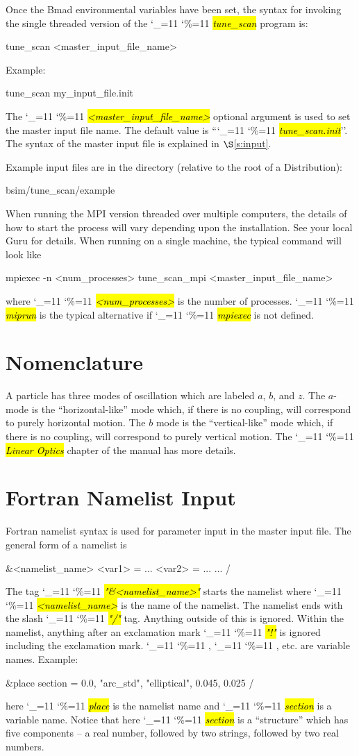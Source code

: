 \documentclass{hitec}
\newcommand\dottcmd[1]{\hl{\em#1}\endgroup}
\newcommand{\vn}{\begingroup\catcode`\_=11 \catcode`\%=11 \dottcmd}
\newcommand{\ts}{\vn{tune_scan}\xspace}
\newcommand{\sref}[1]{$\S$\ref{#1}}
\newcommand{\Section}[1]{\section{#1}\vspace*{-1ex}}
\begin{document}
Once the Bmad environmental variables have been set, the syntax for invoking the single threaded
version of the \ts program is:
\begin{code}
  tune_scan {<master_input_file_name>}
\end{code}
Example:
\begin{code}
  tune_scan my_input_file.init
\end{code}
The \vn{<master_input_file_name>} optional argument is used to set the master input file name. The
default value is ``\vn{tune_scan.init}''. The syntax of the master input file is explained
in \sref{s:input}.

Example input files are in the directory (relative to the root of a Distribution):
\begin{code}
  bsim/tune_scan/example
\end{code}

When running the MPI version threaded over multiple computers, the details of how to start the process will
vary depending upon the installation. See your local Guru for details. When running on a single machine, 
the typical command will look like
\begin{example}
  mpiexec -n <num_processes> tune_scan_mpi {<master_input_file_name>}
\end{example}
where \vn{<num_processes>} is the number of processes. \vn{miprun} is the typical alternative if
\vn{mpiexec} is not defined.

\Section{Nomenclature}
\label{s:nomen}

A particle has three modes of oscillation which are labeled $a$, $b$, and $z$. The $a$-mode is the
``horizontal-like'' mode which, if there is no coupling, will correspond to purely horizontal
motion.  The $b$ mode is the ``vertical-like'' mode which, if there is no coupling, will correspond
to purely vertical motion. The \vn{Linear Optics} chapter of the \bmad manual has more details.

\Section{Fortran Namelist Input}
\label{s:namelist}

Fortran namelist syntax is used for parameter input in the master input file. The general form of a namelist is
\begin{code}
&<namelist_name>
  <var1> = ...
  <var2> = ...
  ...
/
\end{code}
The tag \vn{"\&<namelist_name>"} starts the namelist where
\vn{<namelist_name>} is the name of the namelist. The namelist ends
with the slash \vn{"/"} tag. Anything outside of this is
ignored. Within the namelist, anything after an exclamation mark
\vn{"!"} is ignored including the exclamation mark. \vn{<var1>},
\vn{<var2>}, etc. are variable names. Example:
\begin{code}
&place 
  section = 0.0, "arc_std", "elliptical", 0.045, 0.025 
/
\end{code}
here \vn{place} is the namelist name and \vn{section} is a
variable name.  Notice that here \vn{section} is a ``structure'' which
has five components -- a real number, followed by two strings,
followed by two real numbers.
\end{document}

